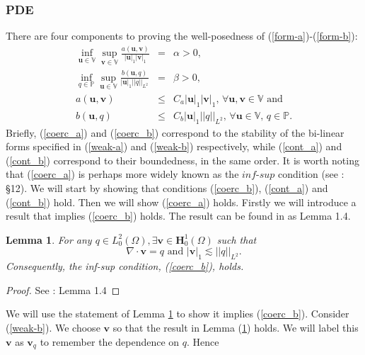 \documentclass[12pt,a4paper]{article}
\newtheorem{lemma}[theorem]{Lemma}
\theoremstyle{definition}
\begin{document}
\subsubsection{PDE}\label{PDE_cont}
There are four components to proving the well-posedness of (\ref{form-a})-(\ref{form-b}):
	 \begin{eqnarray}\label{coerc_a}
	\inf_{\textbf{u}\in \mathbb{V}}\sup_{\textbf{v}\in \mathbb{V}}\frac{a\left(\textbf{u},\textbf{v}\right)}{\left|\textbf{u}\right|_1 \left|\textbf{v}\right|_1}&=&\alpha>0,\\\label{coerc_b}
			\inf_{q\in \mathbb{P}}\sup_{\textbf{u}\in \mathbb{V}}\frac{b\left(\textbf{u},q\right)}{\left|\textbf{u}\right|_1 \left|\left|q\right|\right|_{L^2}}&=&\beta>0,\\\label{cont_a}
		a\left(\textbf{u},\textbf{v}\right)&\leq& C_a\left|\textbf{u}\right|_1\left|\textbf{v}\right|_1,\, \forall \textbf{u},\textbf{v} \in \mathbb{V}\text{ and}\\\label{cont_b}
		b\left(\textbf{u},q\right)&\leq& C_b\left|\textbf{u}\right|_1\left|\left|q\right|\right|_{L^2},\,\forall \textbf{u} \in \mathbb{V},\, q \in \mathbb{P}.
	\end{eqnarray}
Briefly, (\ref{coerc_a}) and (\ref{coerc_b}) correspond to the stability of the bi-linear forms specified in (\ref{weak-a}) and (\ref{weak-b}) respectively, while (\ref{cont_a}) and (\ref{cont_b}) correspond to their boundedness, in the same order. It is worth noting that (\ref{coerc_a}) is perhaps more widely known as the $\textit{inf-sup}$ condition (see \cite{brenner2007mathematical}: \S 12). 
We will start by showing that conditions (\ref{coerc_b}), (\ref{cont_a}) and (\ref{cont_b}) hold.  Then we will show (\ref{coerc_a}) holds.  Firstly we will introduce a result that implies (\ref{coerc_b}) holds.  The result can be found in \cite{Chen2016} as Lemma 1.4.
\begin{lemma}\label{Lemma_equiv}
	For any $q\in L^2_0\left(\Omega\right), \exists \textbf{v}\in \textbf{H}^1_0\left(\Omega\right)$ such that
	\begin{equation}
		\nabla \cdot \textbf{v}= q \text{ and } \left|\textbf{v}\right|_1 \lesssim \left|\left|q\right|\right|_{L^2}\nonumber.
	\end{equation}
	Consequently, the inf-sup condition, (\ref{coerc_b}), holds.
\end{lemma}
\begin{proof}
	See \cite{Chen2016}: Lemma 1.4
\end{proof}
We will use the statement of Lemma \ref{Lemma_equiv} to show it implies (\ref{coerc_b}).  Consider (\ref{weak-b}).  We choose $\textbf{v}$ so that the result in Lemma (\ref{Lemma_equiv}) holds. We will label this $\textbf{v}$ as $\textbf{v}_q$ to remember the dependence on $q$.   Hence
\end{document}
